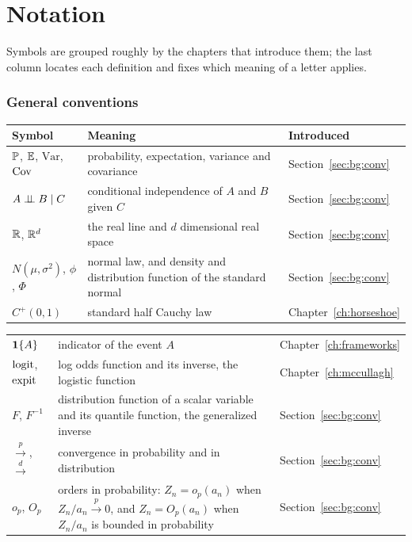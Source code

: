 \chapter{Notation}\label{app:notation}

\raggedbottom

Symbols are grouped roughly by the chapters that introduce them; the last column locates each definition and fixes which meaning of a letter applies.

\subsection*{General conventions}

{\noindent\small\centering
\setlength{\tabcolsep}{4pt}\renewcommand{\arraystretch}{1.1}
\begin{tabular}{>{\raggedright\arraybackslash}p{1.0in}>{\raggedright\arraybackslash}p{2.15in}>{\raggedright\arraybackslash}p{0.95in}}
\toprule
Symbol & Meaning & Introduced \\
\midrule
$\mathbb{P}$, $\mathbb{E}$, $\mathrm{Var}$, $\mathrm{Cov}$ & probability, expectation, variance and covariance & Section~\ref{sec:bg:conv} \\
$A \perp\!\!\!\perp B \mid C$ & conditional independence of $A$ and $B$ given $C$ & Section~\ref{sec:bg:conv} \\
$\mathbb{R}$, $\mathbb{R}^d$ & the real line and $d$ dimensional real space & Section~\ref{sec:bg:conv} \\
$N(\mu, \sigma^2)$, $\phi$, $\Phi$ & normal law, and density and distribution function of the standard normal & Section~\ref{sec:bg:conv} \\
$C^+(0, 1)$ & standard half Cauchy law & Chapter~\ref{ch:horseshoe} \\
\end{tabular}\par}

{\noindent\small\centering
\setlength{\tabcolsep}{4pt}\renewcommand{\arraystretch}{1.1}
\begin{tabular}{>{\raggedright\arraybackslash}p{1.0in}>{\raggedright\arraybackslash}p{2.15in}>{\raggedright\arraybackslash}p{0.95in}}
$\mathbf{1}\{A\}$ & indicator of the event $A$ & Chapter~\ref{ch:frameworks} \\
$\operatorname{logit}$, $\operatorname{expit}$ & log odds function and its inverse, the logistic function & Chapter~\ref{ch:mccullagh} \\
$F$, $F^{-1}$ & distribution function of a scalar variable and its quantile function, the generalized inverse & Section~\ref{sec:bg:conv} \\
$\xrightarrow{p}$, $\xrightarrow{d}$ & convergence in probability and in distribution & Section~\ref{sec:bg:conv} \\
$o_p$, $O_p$ & orders in probability: $Z_n = o_p(a_n)$ when $Z_n/a_n \xrightarrow{p} 0$, and $Z_n = O_p(a_n)$ when $Z_n/a_n$ is bounded in probability & Section~\ref{sec:bg:conv} \\
\end{tabular}\par}

